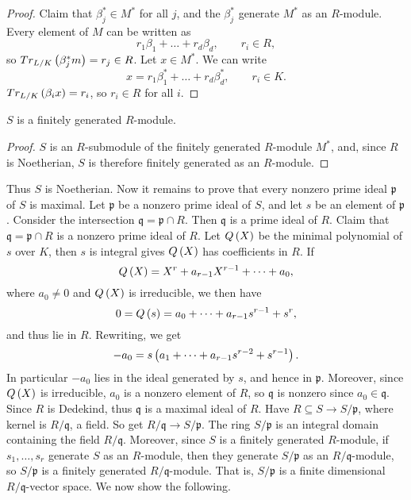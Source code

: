 \begin{proof}
Claim that $ \beta_j^* \in M^* $ for all $ j $, and the $ \beta_j^* $ generate $ M^* $ as an $ R $-module. Every element of $ M $ can be written as
$$ r_1\beta_1 + \dots + r_d\beta_d, \qquad r_i \in R, $$
so $ Tr_{L / K}\left( \beta_j^*m \right) = r_j \in R $. Let $ x \in M^* $. We can write
$$ x = r_1\beta_1^* + \dots + r_d\beta_d^*, \qquad r_i \in K. $$
$ Tr_{L / K}\left( \beta_ix \right) = r_i $, so $ r_i \in R $ for all $ i $.
\end{proof}

\begin{corollary}
$ S $ is a finitely generated $ R $-module.
\end{corollary}

\begin{proof}
$ S $ is an $ R $-submodule of the finitely generated $ R $-module $ M^* $, and, since $ R $ is Noetherian, $ S $ is therefore finitely generated as an $ R $-module.
\end{proof}

Thus $ S $ is Noetherian. Now it remains to prove that every nonzero prime ideal $ \mathfrak{p} $ of $ S $ is maximal. Let $ \mathfrak{p} $ be a nonzero prime ideal of $ S $, and let $ s $ be an element of $ \mathfrak{p} $. Consider the intersection $ \mathfrak{q} = \mathfrak{p} \cap R $. Then $ \mathfrak{q} $ is a prime ideal of $ R $. Claim that $ \mathfrak{q} = \mathfrak{p} \cap R $ is a nonzero prime ideal of $ R $. Let $ Q\left( X \right) $ be the minimal polynomial of $ s $ over $ K $, then $ s $ is integral gives $ Q\left( X \right) $ has coefficients in $ R $. If
$$ Q\left( X \right) = X^r + a_{r - 1}X^{r - 1} + \dots + a_0, $$
where $ a_0 \ne 0 $ and $ Q\left( X \right) $ is irreducible, we then have
$$ 0 = Q\left( s \right) = a_0 + \dots + a_{r - 1}s^{r - 1} + s^r, $$
and thus lie in $ R $. Rewriting, we get
$$ -a_0 = s\left( a_1 + \dots + a_{r - 1}s^{r - 2} + s^{r - 1} \right). $$
In particular $ -a_0 $ lies in the ideal generated by $ s $, and hence in $ \mathfrak{p} $. Moreover, since $ Q\left( X \right) $ is irreducible, $ a_0 $ is a nonzero element of $ R $, so $ \mathfrak{q} $ is nonzero since $ a_0 \in \mathfrak{q} $. Since $ R $ is Dedekind, thus $ \mathfrak{q} $ is a maximal ideal of $ R $. Have $ R \subseteq S \to S / \mathfrak{p} $, where kernel is $ R / \mathfrak{q} $, a field. So get $ R / \mathfrak{q} \to S / \mathfrak{p} $. The ring $ S / \mathfrak{p} $ is an integral domain containing the field $ R / \mathfrak{q} $. Moreover, since $ S $ is a finitely generated $ R $-module, if $ s_1, \dots, s_r $ generate $ S $ as an $ R $-module, then they generate $ S / \mathfrak{p} $ as an $ R / \mathfrak{q} $-module, so $ S / \mathfrak{p} $ is a finitely generated $ R / \mathfrak{q} $-module. That is, $ S / \mathfrak{p} $ is a finite dimensional $ R / \mathfrak{q} $-vector space. We now show the following.

